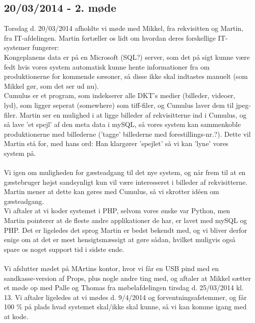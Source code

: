 \documentclass[12pt]{article}
\begin{document}
\subsection*{20/03/2014 - 2. møde}
Torsdag d. 20/03/2014 afholdte vi møde med Mikkel, fra rekvisitten og Martin, fra IT-afdelingen. Martin fortæller os lidt om hvordan deres forskellige IT-systemer fungerer: \\ Kongeplanens data er på en Microsoft (SQL?) server, som det på sigt kunne være fedt hvis vores system automatisk kunne hente informationer fra om produktionerne for kommende sæsoner, så disse ikke skal indtastes manuelt (som Mikkel gør, som det ser ud nu).
\\
Cumulus er et program, som indekserer alle DKT's medier (billeder, videoer, lyd), som ligger seperat (somewhere) som tiff-filer, og Cumulus laver dem til jpeg-filer. Martin ser en mulighed i at ligge billeder af rekvisitterne ind i Cumulus, og så lave 'et spejl' af den meta data i mySQL, så vores system kan sammenkoble produktionerne med billederne ('tagge' billederne med forestillings-nr.?). Dette vil Martin stå for, med hans ord: Han klargører 'spejlet' så vi kan 'lyne' vores system på. \\\\
Vi igen om muligheden for gæsteadgang til det nye system, og når frem til at en gæstebruger højst sandsynligt kun vil være interesseret i billeder af rekvisitterne. Martin mener at dette kan gøres med Cumulus, så vi skrotter idéen om gæsteadgang. \\
Vi aftaler at vi koder systemet i PHP, selvom vores ønske var Python, men Martin pointerer at de fleste andre applikationer de har, er lavet med mySQL og PHP. Det er ligeledes det sprog Martin er bedst bekendt med, og vi bliver derfor enige om at det er mest hensigtsmæssigt at gøre sådan, hvilket muligvis også spare os noget support tid i sidste ende. \\\\
Vi afslutter mødet på MArtins kontor, hvor vi får en USB pind med en sandkasse-version af Props, plus nogle andre ting med, og aftaler at Mikkel sætter et møde op med Palle og Thomas fra møbelafdelingen tirsdag d. 25/03/2014 kl. 13. Vi aftaler ligeledes at vi mødes d. 9/4/2014 og forventningsafstemmer, og får 100 \% på plads hvad systemet skal/ikke skal kunne, så vi kan komme igang med at kode.
\end{document}
